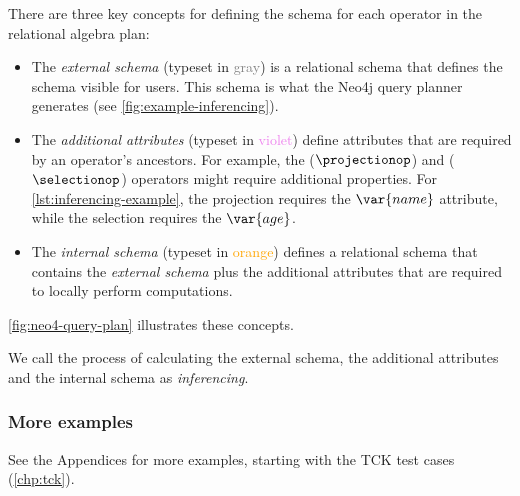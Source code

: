 There are three key concepts for defining the schema for each operator in the relational algebra plan:

\begin{itemize}
	\item The \emph{external schema} (typeset in \textcolor{gray}{gray}) is a relational schema that defines the schema visible for users. This schema is what the Neo4j query planner generates (see \autoref{fig:example-inferencing}).
	
	\item The \emph{additional attributes} (typeset in \textcolor{violet}{violet}) define attributes that are required by an operator's ancestors. For example, the \projectiontext ($\projectionop$) and \selectiontext ($\selectionop$) operators might require additional properties. For \autoref{lst:inferencing-example}, the projection requires the $\var{name}$ attribute, while the selection requires the $\var{age}$.
	
	\item The \emph{internal schema} (typeset in \textcolor{orange}{orange}) defines a relational schema that contains the \emph{external schema} plus the additional attributes that are required to locally perform computations.
\end{itemize}

\autoref{fig:neo4-query-plan} illustrates these concepts.

We call the process of calculating the external schema, the additional attributes and the internal schema as \emph{inferencing}.

\subsubsection{More examples}

See the Appendices for more examples, starting with the TCK test cases (\autoref{chp:tck}).
